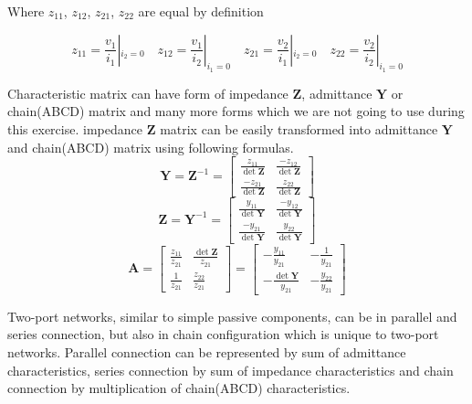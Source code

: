 \documentclass[notitlepage, a4paper, 11pt]{article}
\begin{document}
	Where $z_{11}$, $z_{12}$, $z_{21}$, $z_{22}$ are equal by definition
	
	$$
		z_{11} = \frac{v_1}{i_1} |  _{i_2 = 0} \quad
		z_{12} = \frac{v_1}{i_2} |  _{i_1 = 0} \quad
		z_{21} = \frac{v_2}{i_1} |  _{i_2 = 0} \quad
		z_{22} = \frac{v_2}{i_2} |  _{i_1 = 0}
	$$

	Characteristic matrix can have form of impedance $\mathbf{Z}$, admittance $\mathbf{Y}$ or chain(ABCD) matrix and many more forms which we are not going to use during this exercise.	
	impedance $\mathbf{Z}$ matrix can be easily transformed into admittance $\mathbf{Y}$ and chain(ABCD) matrix using following formulas.
	\begin{equation}\label{eq:ZtoY}
		\mathbf{Y} = \mathbf{Z}^{-1} = 
		\begin{bmatrix}
			\frac{z_{11}}{\det\mathbf{Z}} & \frac{-z_{12}}{\det\mathbf{Z}} \\[4pt]
			\frac{-z_{21}}{\det\mathbf{Z}} & \frac{z_{22}}{\det\mathbf{Z}}
		\end{bmatrix}
	\end{equation}
	\begin{equation}\label{eq:YtoZ}
		\mathbf{Z} = \mathbf{Y}^{-1} = 
		\begin{bmatrix}
			\frac{y_{11}}{\det\mathbf{Y}} & \frac{-y_{12}}{\det\mathbf{Y}} \\[4pt]
			\frac{-y_{21}}{\det\mathbf{Y}} & \frac{y_{22}}{\det\mathbf{Y}}
		\end{bmatrix}
	\end{equation}
	\begin{equation}\label{eq:toA}
		\mathbf{A} =
		\begin{bmatrix}
			\frac{z_{11}}{z_{21}} & \frac{\det \mathbf{Z}}{z_{21}} \\[4pt]
			\frac{1}{z_{21}} & \frac{z_{22}}{z_{21}}
		\end{bmatrix}
		=
		\begin{bmatrix}
			-\frac{y_{11}}{y_{21}} & -\frac{1}{y_{21}} \\[4pt]
			-\frac{\det \mathbf{Y}}{y_{21}} & -\frac{y_{22}}{y_{21}}
		\end{bmatrix}
	\end{equation}

	Two-port networks, similar to simple passive components, can be in parallel and series connection, but also in chain configuration which is unique to two-port networks.
	Parallel connection can be represented by sum of admittance characteristics, series connection by sum of impedance characteristics and chain connection by multiplication of chain(ABCD) characteristics.%
		
\end{document}
